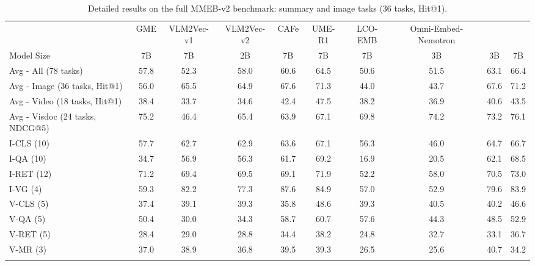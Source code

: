 \begin{table}[!t]
    \centering
\caption{Detailed results on the full MMEB-v2 benchmark: summary and image tasks (36 tasks, Hit@1).}
\label{tab:full_score_image}
    \renewcommand{\arraystretch}{1.1}
    \begin{adjustbox}{width=\textwidth}
    \begin{tabular}{l|ccccccccc}
        \toprule
        ~ & GME & VLM2Vec-v1 & VLM2Vec-v2 & CAFe & UME-R1 & LCO-EMB & Omni-Embed-Nemotron & \ours{} & \ours{} \\
        Model Size & 7B & 7B & 2B & 7B & 7B & 7B & 3B & 3B & 7B \\
        \midrule
        \rowcolor{avgcolor}
        Avg - All (78 tasks) & 57.8 & 52.3 & 58.0 & 60.6 & 64.5 & 50.6 & 51.5 & 63.1 & 66.4 \\
        \rowcolor{avgcolor}
        Avg - Image (36 tasks, Hit@1) & 56.0 & 65.5 & 64.9 & 67.6 & 71.3 & 44.0 & 43.7 & 67.6 & 71.2 \\
        \rowcolor{avgcolor}
        Avg - Video (18 tasks, Hit@1) & 38.4 & 33.7 & 34.6 & 42.4 & 47.5 & 38.2 & 36.9 & 40.6 & 43.5 \\
        \rowcolor{avgcolor}
        Avg - Visdoc (24 tasks, NDCG@5) & 75.2 & 46.4 & 65.4 & 63.9 & 67.1 & 69.8 & 74.2 & 73.2 & 76.1 \\
        \rowcolor{icatcolor}
        I-CLS (10) & 57.7 & 62.7 & 62.9 & 63.6 & 67.1 & 56.3 & 46.0 & 64.7 & 66.7 \\
        \rowcolor{icatcolor}
        I-QA (10) & 34.7 & 56.9 & 56.3 & 61.7 & 69.2 & 16.9 & 20.5 & 62.1 & 68.5 \\
        \rowcolor{icatcolor}
        I-RET (12) & 71.2 & 69.4 & 69.5 & 69.1 & 71.9 & 52.2 & 58.0 & 70.5 & 73.0 \\
        \rowcolor{icatcolor}
        I-VG (4) & 59.3 & 82.2 & 77.3 & 87.6 & 84.9 & 57.0 & 52.9 & 79.6 & 83.9 \\
        \rowcolor{vcatcolor}
        V-CLS (5) & 37.4 & 39.1 & 39.3 & 35.8 & 48.6 & 39.3 & 40.5 & 40.2 & 46.6 \\
        \rowcolor{vcatcolor}
        V-QA (5) & 50.4 & 30.0 & 34.3 & 58.7 & 60.7 & 57.6 & 44.3 & 48.5 & 52.9 \\
        \rowcolor{vcatcolor}
        V-RET (5) & 28.4 & 29.0 & 28.8 & 34.4 & 38.2 & 24.8 & 32.7 & 33.1 & 36.7 \\
        \rowcolor{vcatcolor}
        V-MR (3) & 37.0 & 38.9 & 36.8 & 39.5 & 39.3 & 26.5 & 25.6 & 40.7 & 34.2 \\
        \rowcolor{vdcatcolor}

\end{tabular}
\end{adjustbox}
\end{table}
